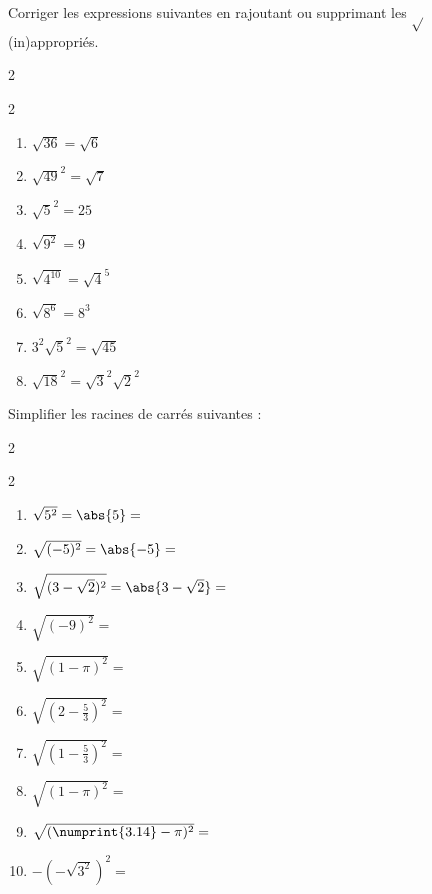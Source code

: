 \documentclass[main.tex]{subfiles}
\begin{document}
\begin{exercise}[\cancel{\faCalculator}] Corriger les expressions suivantes en rajoutant ou supprimant les $\sqrt{}$ (in)appropriés.
	\begin{multicols}{2}
		\begin{spacing}{2} 
			\begin{enumerate}[label={}, leftmargin=*]   
				\item  $\sqrt{36}=\sqrt{6}$ \dotfill  
				\item $\sqrt{49}^2=\sqrt{7}$ \dotfill
				\item $\sqrt{5}^2=25$ \dotfill
				\item $\sqrt{9^2}=9$ \dotfill
				\item $\sqrt{4^{10}}=\sqrt{4}^5$\dotfill
				\item $\sqrt{8^6}=8^3$\dotfill
				\item $3^2\sqrt{5}^2=\sqrt{45}$\dotfill 
				\item $ \sqrt{18}^2=\sqrt{3}^2\sqrt{2}^2$\dotfill 
			\end{enumerate}
		\end{spacing}
	\end{multicols}	\vspace{-0.5em}
\end{exercise}
\begin{exercise}[\cancel{\faCalculator}] Simplifier les racines de carrés suivantes :
	\begin{multicols}{2}
		\begin{spacing}{2} 
			\begin{enumerate}[label={}, leftmargin=*]   
				\item $\sqrt{5^2}=\abs{5}=$	\dotfill
				\item $\sqrt{(-5)^2}=\abs{-5}=$\dotfill  
				\item $\sqrt{(3-\sqrt{2})^2}=\abs{3-\sqrt{2}}=$\dotfill
				\item $\sqrt{\left(-9\right)^2}=$\dotfill  
				\item $\sqrt{(1-\pi)^2}=$\dotfill
				\item $\sqrt{\left(2-\tfrac{5}{3}\right)^2}=$\dotfill 
				\item $\sqrt{\left(1-\tfrac{5}{3}\right)^2}=$\dotfill 
				\item $\sqrt{(1-\pi)^2}=$\dotfill 
				\item  $\sqrt{(\numprint{3.14}-\pi)^2}=$\dotfill 
				\item  $-\left(-\sqrt{3^2}\right)^2=$\dotfill 
			\end{enumerate}
		\end{spacing}
	\end{multicols}	\vspace{-0.5em}
\end{exercise} 
\end{document}
